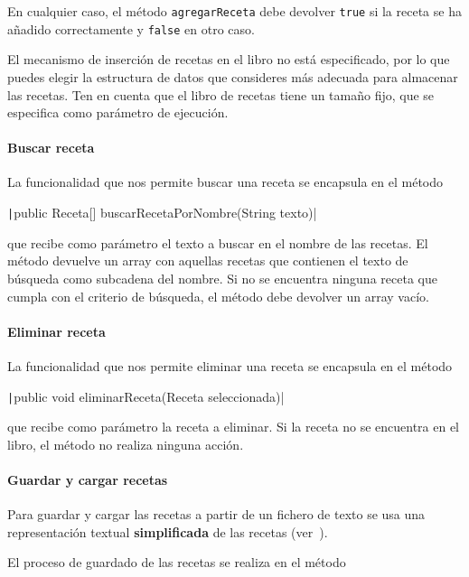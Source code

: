 \documentclass[
    a4paper, %
    12pt, %
]{CSSullivanBusinessReport}
\begin{document}
En cualquier caso, el método \texttt{agregarReceta} debe devolver \texttt{true} si la receta se ha añadido correctamente y \texttt{false} en otro caso.

El mecanismo de inserción de recetas en el libro no está especificado, por lo que puedes elegir la estructura de datos que consideres más adecuada para almacenar las recetas. Ten en cuenta que el libro de recetas tiene un tamaño fijo, que se especifica como parámetro de ejecución.

\paragraph{Buscar receta}

La funcionalidad que nos permite buscar una receta se encapsula en el método

\texttt|public Receta[] buscarRecetaPorNombre(String texto)|

que recibe como parámetro el texto a buscar en el nombre de las recetas. El método devuelve un array con aquellas recetas que contienen el texto de búsqueda como subcadena del nombre. Si no se encuentra ninguna receta que cumpla con el criterio de búsqueda, el método debe devolver un array vacío.

\paragraph{Eliminar receta}

La funcionalidad que nos permite eliminar una receta se encapsula en el método

\texttt|public void eliminarReceta(Receta seleccionada)|

que recibe como parámetro la receta a eliminar. Si la receta no se encuentra en el libro, el método no realiza ninguna acción.

\paragraph{Guardar y cargar recetas}

Para guardar y cargar las recetas a partir de un fichero de texto se usa una representación textual \textbf{simplificada} de las recetas (ver~).

El proceso de guardado de las recetas se realiza en el método
\end{document}
